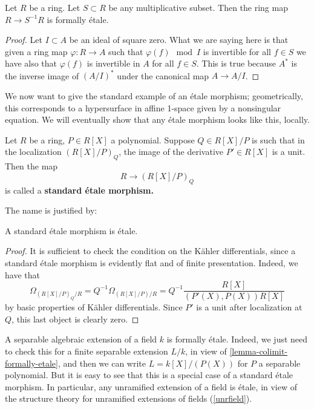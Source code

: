 \begin{lemma}
\label{lemma-localization-formally-etale}
Let $R$ be a ring. Let $S \subset R$ be any multiplicative subset.
Then the ring map $R \to S^{-1}R$ is formally \'etale.
\end{lemma}

\begin{proof}
Let $I \subset A$ be an ideal of square zero. What we are saying
here is that given a ring map $\varphi : R \to A$ such that
$\varphi(f) \mod I$ is invertible for all $f \in S$ we have also that
$\varphi(f)$ is invertible in $A$ for all $f \in S$. This is true because
$A^*$ is the inverse image of $(A/I)^*$ under the canonical map
$A \to A/I$.
\end{proof}


We now want to give the standard example of an \'etale morphism;
geometrically, this corresponds to a hypersurface in affine 1-space given by
a nonsingular equation. We will eventually show that any \'etale
morphism looks like this, locally. 


\begin{example} 
Let $R$ be a ring, $P \in R[X]$ a polynomial. Suppose $Q \in R[X]/P$ is such that in the
localization $(R[X]/P)_Q$, the image of the derivative $P' \in R[X]$ is a unit. Then the map
\[ R \to (R[X]/P)_Q  \]
is called a \textbf{standard \'etale morphism.}
\end{example} 



The name is justified by:
\begin{proposition} 
A standard \'etale morphism is \'etale.
\end{proposition} 
\begin{proof} 
It is sufficient to check the condition on the K\"ahler differentials, since a
standard \'etale morphism is evidently flat and of finite presentation. 
Indeed, we have that
\[ \Omega_{(R[X]/P)_Q/R} = Q^{-1} \Omega_{(R[X]/P)/R} = Q^{-1}
\frac{R[X]}{(P'(X), P(X)) R[X]}  \]
by basic properties of K\"ahler differentials. Since $P'$ is a unit after
localization at $Q$, this last object is clearly zero. 
\end{proof} 

\begin{example} \label{etalefield}
A separable algebraic extension of a field  $k$ is formally \'etale. 
Indeed, we just need to check this 
for a finite separable extension $L/k$, in view of \cref{lemma-colimit-formally-etale}, and then we can write $L = k[X]/(P(X))$
for $P$ a separable polynomial. But it is easy to see that this is a special
case of a standard \'etale morphism.
In particular, any unramified extension of a field is \'etale, in view of the
structure theory for unramified extensions of fields (\cref{unrfield}).
\end{example} 


